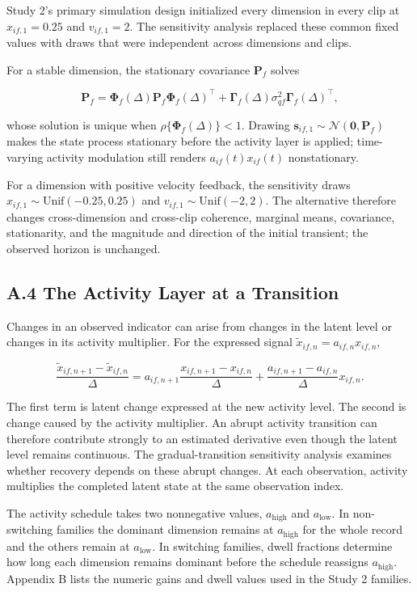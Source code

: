 \documentclass[
]{article}
\begin{document}
Study 2's primary simulation design initialized every dimension in every
clip at \(x_{if,1}=0.25\) and \(v_{if,1}=2\). The sensitivity analysis
replaced these common fixed values with draws that were independent
across dimensions and clips.

For a stable dimension, the stationary covariance \(\mathbf P_f\) solves

\[
\mathbf{P}_f=\boldsymbol{\Phi}_f(\Delta)\mathbf{P}_f\boldsymbol{\Phi}_f(\Delta)^\top
+\boldsymbol{\Gamma}_f(\Delta)\sigma_{qf}^2\boldsymbol{\Gamma}_f(\Delta)^\top,
\]

whose solution is unique when \(\rho\{\boldsymbol{\Phi}_f(\Delta)\}<1\).
Drawing \(\mathbf{s}_{if,1}\sim\mathcal{N}(\mathbf{0},\mathbf{P}_f)\)
makes the state process stationary before the activity layer is applied;
time-varying activity modulation still renders \(a_{if}(t)x_{if}(t)\)
nonstationary.

For a dimension with positive velocity feedback, the sensitivity draws
\(x_{if,1}\sim\mathrm{Unif}(-0.25,0.25)\) and
\(v_{if,1}\sim\mathrm{Unif}(-2,2)\). The alternative therefore changes
cross-dimension and cross-clip coherence, marginal means, covariance,
stationarity, and the magnitude and direction of the initial transient;
the observed horizon is unchanged.

\subsection{A.4 The Activity Layer at a
Transition}\label{a.4-the-activity-layer-at-a-transition}

Changes in an observed indicator can arise from changes in the latent
level or changes in its activity multiplier. For the expressed signal
\(\tilde{x}_{if,n}=a_{if,n}x_{if,n}\),

\[
\frac{\tilde{x}_{if,n+1}-\tilde{x}_{if,n}}{\Delta}
=a_{if,n+1}\frac{x_{if,n+1}-x_{if,n}}{\Delta}
+\frac{a_{if,n+1}-a_{if,n}}{\Delta}x_{if,n}.
\]

The first term is latent change expressed at the new activity level. The
second is change caused by the activity multiplier. An abrupt activity
transition can therefore contribute strongly to an estimated derivative
even though the latent level remains continuous. The gradual-transition
sensitivity analysis examines whether recovery depends on these abrupt
changes. At each observation, activity multiplies the completed latent
state at the same observation index.

The activity schedule takes two nonnegative values,
\(a_{\mathrm{high}}\) and \(a_{\mathrm{low}}\). In non-switching
families the dominant dimension remains at \(a_{\mathrm{high}}\) for the
whole record and the others remain at \(a_{\mathrm{low}}\). In switching
families, dwell fractions determine how long each dimension remains
dominant before the schedule reassigns \(a_{\mathrm{high}}\). Appendix B
lists the numeric gains and dwell values used in the Study 2 families.
\end{document}
